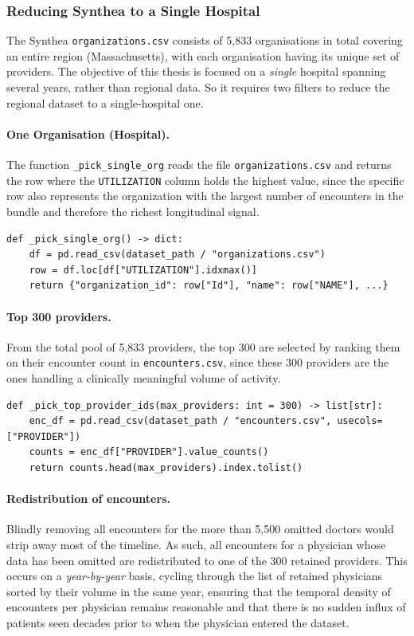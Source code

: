 \subsubsection*{Reducing Synthea to a Single Hospital}

The Synthea \texttt{organizations.csv} consists of 5,833 organisations in total covering an entire region (Massachusetts), with each organisation having its unique set of providers. The objective of this thesis is focused on a \emph{single} hospital spanning several years, rather than regional data. So it requires two filters to reduce the regional dataset to a single-hospital one.

\paragraph{One Organisation (Hospital).} The function \texttt{\_pick\_single\_org} reads the file \texttt{organizations.csv} and returns the row where the \texttt{UTILIZATION} column holds the highest value, since the specific row also represents the organization with the largest number of encounters in the bundle and therefore the richest longitudinal signal.

\begin{lstlisting}[style=pythonstyle]
def _pick_single_org() -> dict:
    df = pd.read_csv(dataset_path / "organizations.csv")
    row = df.loc[df["UTILIZATION"].idxmax()]
    return {"organization_id": row["Id"], "name": row["NAME"], ...}
\end{lstlisting}

\paragraph{Top 300 providers.} From the total pool of 5,833 providers, the top 300 are selected by ranking them on their encounter count in \texttt{encounters.csv}, since these 300 providers are the ones handling a clinically meaningful volume of activity.

\begin{lstlisting}[style=pythonstyle]
def _pick_top_provider_ids(max_providers: int = 300) -> list[str]:
    enc_df = pd.read_csv(dataset_path / "encounters.csv", usecols=["PROVIDER"])
    counts = enc_df["PROVIDER"].value_counts()
    return counts.head(max_providers).index.tolist()
\end{lstlisting}

\paragraph{Redistribution of encounters.} Blindly removing all encounters for the more than 5,500 omitted doctors would strip away most of the timeline. As such, all encounters for a physician whose data has been omitted are redistributed to one of the 300 retained providers. This occurs on a \emph{year-by-year} basis, cycling through the list of retained physicians sorted by their volume in the same year, ensuring that the temporal density of encounters per physician remains reasonable and that there is no sudden influx of patients seen decades prior to when the physician entered the dataset.


